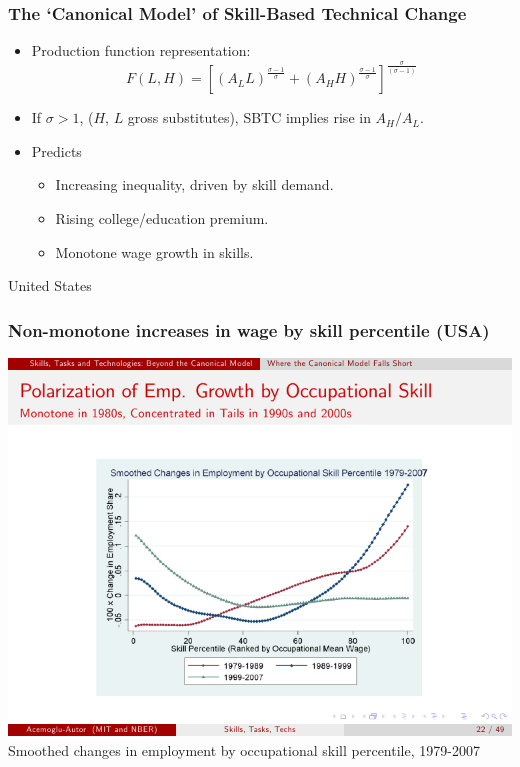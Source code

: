 \documentclass[red]{beamer}
\begin{document}
\begin{frame}
\frametitle{The `Canonical Model' of Skill-Based Technical Change}
\begin{itemize}
\item Production function representation:
\begin{equation*}
  \label{eq:cobbdoug}
  F(L,H) = \left[\left(A_LL\right)^{\frac{\sigma - 1}{\sigma}}
            + \left(A_HH\right)^{\frac{\sigma - 1}{\sigma}}
          \right]^\frac{\sigma}{(\sigma-1)}
\end{equation*}
\item If $\sigma>1$, ($H$, $L$ gross substitutes), SBTC implies rise in $A_H/A_L$.
\vspace{1cm}
\item Predicts
  \begin{itemize}
  \item Increasing inequality, driven by skill demand.
  \item Rising college/education premium.
  \item Monotone wage growth in skills.
  \end{itemize}
\end{itemize}
\end{frame}

\begin{frame}[t]{United States}
\frametitle{Non-monotone increases in wage by skill percentile (USA)}
\begin{center}
\includegraphics[width=\textwidth]{slides/emp_occ_skill_percentile.pdf}
\\
Smoothed changes in employment by occupational skill percentile, 1979-2007
\citep{Acemoglu2011}
\end{center}
\end{frame}
\end{document}
